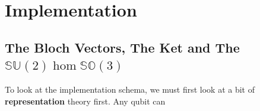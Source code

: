 \documentclass[12pt]{article}
\begin{document}
\section{Implementation}
\subsection{The Bloch Vectors, The Ket and The $\mathbb{SU}(2)\hom\mathbb{SO}(3)$}
To look at the implementation schema, we must first look at a bit of \textbf{representation} theory first. Any qubit can 


\end{document}
